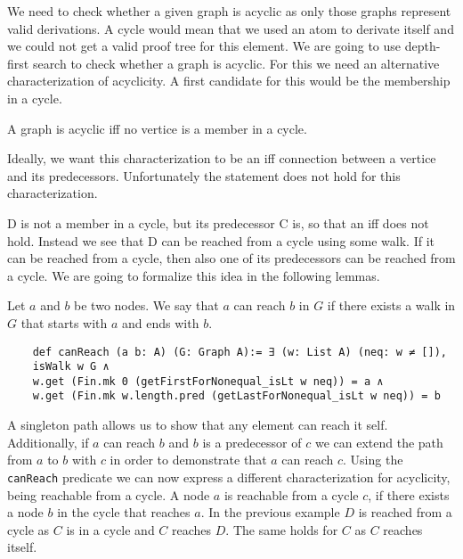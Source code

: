 We need to check whether a given graph is acyclic as only those graphs represent valid derivations. A cycle would mean that we used an atom to derivate itself and we could not get a valid proof tree for this element. We are going to use depth-first search to check whether a graph is acyclic. For this we need an alternative characterization of acyclicity.
A first candidate for this would be the membership in a cycle.

\begin{lemma}
    A graph is acyclic iff no vertice is a member in a cycle.
\end{lemma}

Ideally, we want this characterization to be an iff connection between a vertice and its predecessors. Unfortunately the statement does not hold for this characterization.


D is not a member in a cycle, but its predecessor C is, so that an iff does not hold. Instead we see that D can be reached from a cycle using some walk. If it can be reached from a cycle, then also one of its predecessors can be reached from a cycle. We are going to formalize this idea in the following lemmas.

Let $a$ and $b$ be two nodes. We say that $a$ can reach $b$ in $G$ if there exists a walk in $G$ that starts with $a$ and ends with $b$.

\begin{lstlisting}
    def canReach (a b: A) (G: Graph A):= ∃ (w: List A) (neq: w ≠ []),
    isWalk w G ∧
    w.get (Fin.mk 0 (getFirstForNonequal_isLt w neq)) = a ∧
    w.get (Fin.mk w.length.pred (getLastForNonequal_isLt w neq)) = b
\end{lstlisting}

A singleton path allows us to show that any element can reach it self. Additionally, if $a$ can reach $b$ and $b$ is a predecessor of $c$ we can extend the path from $a$ to $b$ with $c$ in order to demonstrate that $a$ can reach $c$. Using the \texttt{canReach} predicate we can now express a different characterization for acyclicity, being reachable from a cycle. A node $a$ is reachable from a cycle $c$, if there exists a node $b$ in the cycle that reaches $a$. In the previous example $D$ is reached from a cycle as $C$ is in a cycle and $C$ reaches $D$. The same holds for $C$ as $C$ reaches itself.

